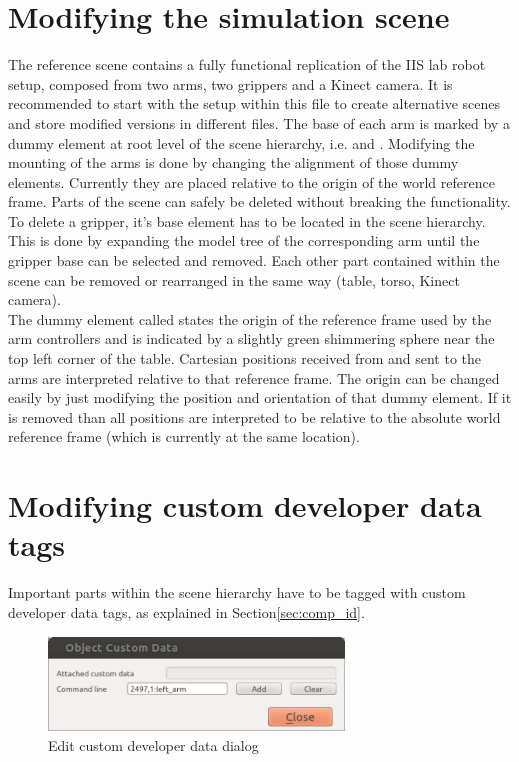 \section{Modifying the simulation scene}

The reference scene contains a fully functional replication of the IIS lab robot setup, composed from two arms, two grippers and a Kinect camera. It is recommended to start with the setup within this file to create alternative scenes and store modified versions in different files. The base of each arm is marked by a dummy element at root level of the scene hierarchy, i.e.  and . Modifying the mounting of the arms is done by changing the alignment of those dummy elements. Currently they are placed relative to the origin of the world reference frame. Parts of the scene can safely be deleted without breaking the functionality. To delete a gripper, it's base element has to be located in the scene hierarchy. This is done by expanding the model tree of the corresponding arm until the gripper base  can be selected and removed. Each other part contained within the scene can be removed or rearranged in the same way (table, torso, Kinect camera).\\

The dummy element called  states the origin of the reference frame used by the arm controllers and is indicated by a slightly green shimmering sphere near the top left corner of the table. Cartesian positions received from and sent to the arms are interpreted relative to that reference frame. The origin can be changed easily by just modifying the position and orientation of that dummy
element. If it is removed than all positions are interpreted to be relative to the absolute world reference frame (which is currently at the same location).

\section{Modifying custom developer data tags}

Important parts within the scene hierarchy have to be tagged with custom developer data tags, as explained in Section\ref{sec:comp_id}.
\begin{figure}[h]
	\centering
  	\includegraphics[width=0.7\textwidth]{images/dlg_cust_data.jpg}
	\caption{Edit custom developer data dialog}
	\label{fig:change_dev_data}
\end{figure} 

